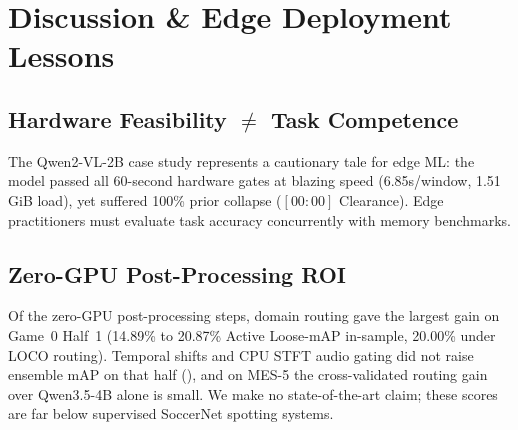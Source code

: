 \documentclass[10pt,twocolumn,letterpaper]{article}
\begin{document}
\begin{table}[h]
\centering
\small
\caption{\textbf{Tracks F, G, and H: scripted illustrations (no model run; see text).}}
\label{tab:v4_tracks_fgh}
\end{table}

\section{Discussion \& Edge Deployment Lessons}
\label{sec:discussion}

\subsection{Hardware Feasibility $\neq$ Task Competence}
The Qwen2-VL-2B case study represents a cautionary tale for edge ML: the model passed all 60-second hardware gates at blazing speed (6.85s/window, 1.51\,GiB load), yet suffered 100\% prior collapse ($[00:00]$ Clearance). Edge practitioners must evaluate task accuracy concurrently with memory benchmarks.

\subsection{Zero-GPU Post-Processing ROI}
Of the zero-GPU post-processing steps, domain routing gave the largest gain on Game~0 Half~1 (14.89\% to 20.87\% Active Loose-mAP in-sample, 20.00\% under LOCO routing). Temporal shifts and CPU STFT audio gating did not raise ensemble mAP on that half (), and on MES-5 the cross-validated routing gain over Qwen3.5-4B alone is small. We make no state-of-the-art claim; these scores are far below supervised SoccerNet spotting systems.
\end{document}
